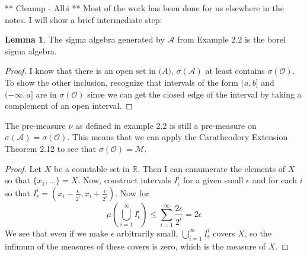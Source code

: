 \documentclass[12pt]{article}
\newenvironment{problem}[2][Problem]{\begin{trivlist}
\item[\hskip \labelsep {\bfseries #1}\hskip \labelsep {\bfseries #2.}]}{\end{trivlist}}
\theoremstyle{definition}
\theoremstyle{definition}
\newtheorem{lemma}{Lemma}[section]
\theoremstyle{definition}
\theoremstyle{definition}
\begin{document}
\begin{problem}{2.14} ** Cleanup - Albi ** Most of the work has been done for us elsewhere in the notes. I will show a brief intermediate step:
\begin{lemma}
The sigma algebra generated by $\mathcal{A}$ from Example 2.2 is the borel sigma algebra.
\end{lemma}
\begin{proof}
I know that there is an open set in $\mathcal(A)$, $\sigma(\mathcal{A})$ at least contains $\sigma(\mathcal{O})$. To show the other inclusion, recognize that intervals of the form $(a,b]$ and $(-\infty, a]$ are in $\sigma(\mathcal{O})$ since we can get the closed edge of the interval by taking a complement of an open interval. 
\end{proof}
The pre-measure $\nu$ as defined in example 2.2 is still a pre-measure on $\sigma(\mathcal{A}) = \sigma(\mathcal{O}).$ This means that we can apply the Caratheodory Extension Theorem 2.12 to see that $\sigma(\mathcal{O}) = \mathcal{M}$.
\end{problem}

\begin{problem}{3.1}
\begin{proof}
Let $X$ be a countable set in $\mathbb{R}$. Then I can ennumerate the elements of $X$ so that $\{x_1, ... \} = X$. Now, construct intervals $I_\epsilon^i$ for a given small $\epsilon$ and for each $i$ so that $I_\epsilon^i = (x_i - \frac{\epsilon}{2^i}, x_i + \frac{\epsilon}{2^i})$. Now for $$\mu(\bigcup_{i=1}^\infty I^i_\epsilon) \leq \sum_{i=1}^{\infty} \frac{2\epsilon}{2^i} = 2\epsilon$$
We see that even if we make $\epsilon$ arbitrarily small, $\bigcup_{i=1}^\infty I^i_\epsilon$ covers $X$, so the infimum of the measures of these covers is zero, which is the measure of $X$.
\end{proof}
\end{problem}
\end{document}
